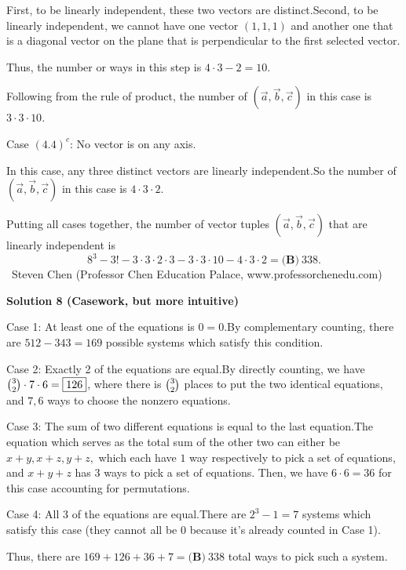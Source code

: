 \begin{enumerate}
 First, to be linearly independent, these two vectors are distinct.Second, to be linearly independent, we cannot have one vector $(1,1,1)$ and another one that is a diagonal vector on the plane that is perpendicular to the first selected vector.

 Thus, the number or ways in this step is $4 \cdot 3-2 = 10$.

 Following from the rule of product, the number of $\left( \overrightarrow{a} , \overrightarrow{b} , \overrightarrow{c} \right)$ in this case is $3 \cdot 3 \cdot 10$.

 Case $(4.4)^c$: No vector is on any axis.

 In this case, any three distinct vectors are linearly independent.So the number of $\left( \overrightarrow{a} , \overrightarrow{b} , \overrightarrow{c} \right)$ in this case is $4 \cdot 3 \cdot 2$.

 Putting all cases together, the number of vector tuples $\left( \overrightarrow{a} , \overrightarrow{b} , \overrightarrow{c} \right)$ that are linearly independent is
 \[ 8^3 - 3!  - 3 \cdot 3 \cdot 2 \cdot 3 - 3 \cdot 3 \cdot 10 - 4 \cdot 3 \cdot 2 = \boxed{\textbf{(B)}\ 338}. \]~Steven Chen (Professor Chen Education Palace, www.professorchenedu.com)

 



\textbf{Solution 8 (Casework, but more intuitive)}

Case 1: At least one of the equations is $0=0$.By complementary counting, there are $512-343=\boxed{169}$ possible systems which satisfy this condition.

 Case 2: Exactly 2 of the equations are equal.By directly counting, we have $\tbinom{3}{2} \cdot 7 \cdot 6=\boxed{126}$, where there is $\tbinom{3}{2}$ places to put the two identical equations, and $7,6$ ways to choose the nonzero equations.

 Case 3: The sum of two different equations is equal to the last equation.The equation which serves as the total sum of the other two can either be $x+y,x+z,y+z,$ which each have $1$ way respectively to pick a set of equations, and $x+y+z$ has $3$ ways to pick a set of equations. Then, we have $6 \cdot 6=\boxed{36}$ for this case accounting for permutations.

 Case 4: All 3 of the equations are equal.There are $2^3-1=\boxed{7}$ systems which satisfy this case (they cannot all be $0$ because it's already counted in Case 1).

 Thus, there are $169+126+36+7=\boxed{\textbf{(B)}\ 338}$ total ways to pick such a system.


\end{enumerate}
